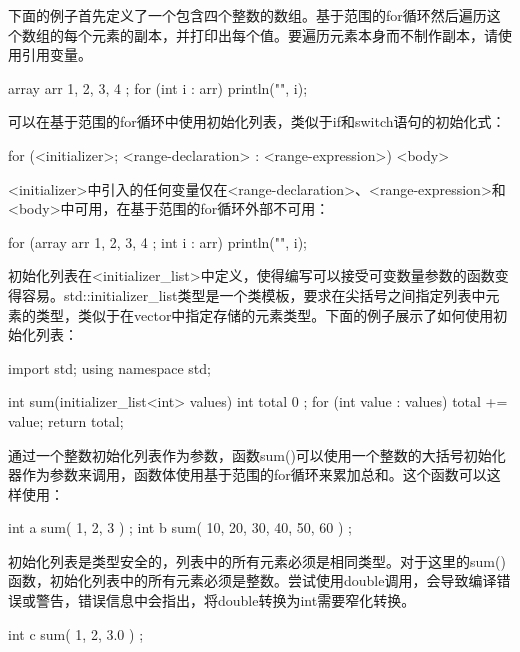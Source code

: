 下面的例子首先定义了一个包含四个整数的数组。基于范围的for循环然后遍历这个数组的每个元素的副本，并打印出每个值。要遍历元素本身而不制作副本，请使用引用变量。

\begin{cpp}
array arr { 1, 2, 3, 4 };
for (int i : arr) { println("{}", i); }
\end{cpp}


可以在基于范围的for循环中使用初始化列表，类似于if和switch语句的初始化式：

\begin{cpp}
for (<initializer>; <range-declaration> : <range-expression>) { <body> }
\end{cpp}

<initializer>中引入的任何变量仅在<range-declaration>、<range-expression>和<body>中可用，在基于范围的for循环外部不可用：

\begin{cpp}
for (array arr { 1, 2, 3, 4 }; int i : arr) { println("{}", i); }
\end{cpp}


初始化列表在<initializer\_list>中定义，使得编写可以接受可变数量参数的函数变得容易。std::initializer\_list类型是一个类模板，要求在尖括号之间指定列表中元素的类型，类似于在vector中指定存储的元素类型。下面的例子展示了如何使用初始化列表：

\begin{cpp}
import std;
using namespace std;

int sum(initializer_list<int> values)
{
    int total { 0 };
    for (int value : values) {
        total += value;
    }
    return total;
}
\end{cpp}

通过一个整数初始化列表作为参数，函数sum()可以使用一个整数的大括号初始化器作为参数来调用，函数体使用基于范围的for循环来累加总和。这个函数可以这样使用：

\begin{cpp}
int a { sum({ 1, 2, 3 }) };
int b { sum({ 10, 20, 30, 40, 50, 60 }) };
\end{cpp}

初始化列表是类型安全的，列表中的所有元素必须是相同类型。对于这里的sum()函数，初始化列表中的所有元素必须是整数。尝试使用double调用，会导致编译错误或警告，错误信息中会指出，将double转换为int需要窄化转换。

\begin{cpp}
int c { sum({ 1, 2, 3.0 }) };
\end{cpp}

